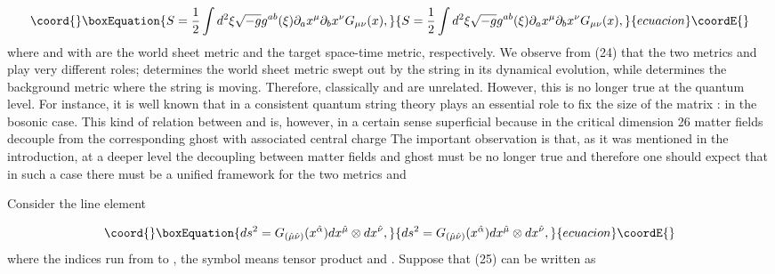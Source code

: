 \documentclass[a4paper,12pt]{article}
\begin{document}
\begin{equation}\coord{}\boxEquation{
S=\frac{1}{2}\int d^{2}\xi \sqrt{-g}g^{ab}(\xi )\partial _{a}x^{\mu
}\partial _{b}x^{\nu }G_{\mu \nu }(x),  \label{24}
}{
S=\frac{1}{2}\int d^{2}\xi \sqrt{-g}g^{ab}(\xi )\partial _{a}x^{\mu
}\partial _{b}x^{\nu }G_{\mu \nu }(x),  }{ecuacion}\coordE{}\end{equation}
where \coordHE{} and \coordHE{} with \coordHE{} are
the world sheet metric and the target space-time metric, respectively. We
observe from (24) that the two metrics \coordHE{} and \coordHE{}
play very different roles; \coordHE{} determines the world sheet metric
swept out by the string in its dynamical evolution, while \coordHE{}
determines the background metric where the string is moving. Therefore,
classically \coordHE{} and \coordHE{} are unrelated. However,
this is no longer true at the quantum level. For instance, it is well known
that in a consistent quantum string theory \coordHE{} plays an essential
role to fix the size of the matrix \coordHE{}: \coordHE{} in the bosonic
case. This kind of relation between \coordHE{} and \coordHE{} is,
however, in a certain sense superficial because in the critical dimension 26
matter fields decouple from the corresponding ghost with associated central
charge \coordHE{} The important observation is that, as it was mentioned in
the introduction, at a deeper level the decoupling between matter fields and
ghost must be no longer true and therefore one should expect that in such a
case there must be a unified framework for the two metrics \coordHE{}
and \coordHE{}

Consider the line element

\begin{equation}\coord{}\boxEquation{
ds^{2}=G_{(\hat{\mu}\hat{\nu})}(x^{\hat{\alpha}})dx^{\hat{\mu}}\otimes dx^{
\hat{\nu}},  \label{25}
}{
ds^{2}=G_{(\hat{\mu}\hat{\nu})}(x^{\hat{\alpha}})dx^{\hat{\mu}}\otimes dx^{
\hat{\nu}},  }{ecuacion}\coordE{}\end{equation}
where the indices \myHighlight{$\hat{\mu},$}\coordHE{}  \myHighlight{$\hat{\nu}$}\coordHE{} run from \coordHE{} to \coordHE{}, the symbol \myHighlight{$%
\otimes $}\coordHE{} means tensor product and \coordHE{}. Suppose that (25) can be written as
\end{document}

